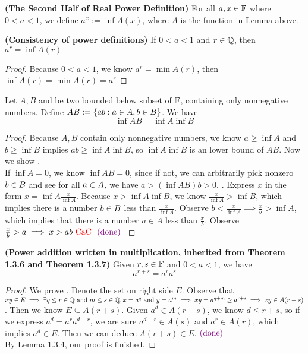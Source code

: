 \documentclass{report}
\begin{document}
\begin{definition}
\textbf{(The Second Half of Real Power Definition)} For all $a,x\in\mathbb{F}$ where $0<a<1$, we define  $a^x:=\inf  A(x)$, where $A$ is the function in Lemma above.
\end{definition}
\begin{theorem}
\textbf{(Consistency of power definitions)} If $0<a<1$ and  $r\in\mathbb{Q}$, then $a^r=\inf A(r)$
\end{theorem}
\begin{proof}
Because $0<a<1$, we know  $a^r=\min A(r)$, then $\inf A(r)=\min A(r)=a^r$   
\end{proof}
\begin{lemma}
Let $A,B$ and be two bounded below subset of  $\mathbb{F}$, containing only nonnegative numbers. Define $AB:=\{ ab:a\in A,b\in B \}$. We have    
\begin{equation}
\inf  AB=\inf  A \inf  B
\end{equation}
\end{lemma}
\begin{proof}
Because $A,B$ contain only nonnegative numbers, we know $a\geq \inf  A$ and $b\geq \inf  B$ implies $ab\geq \inf  A \inf  B$, so $\inf  A \inf  B$ is an lower bound of $AB$. Now we show .\\

If $\inf A=0$, we know $\inf AB=0$, since if not, we can arbitrarily pick nonzero $b\in B$ and see for all $a\in A$, we have $a>(\inf AB)b>0$. . Express $x$ in the form  $x=\inf  A \frac{x}{\inf  A}$. Because $x>\inf  A \inf  B$, we know $\frac{x}{\inf  A}>\inf  B$, which implies there is a number  $b\in B$ less than $\frac{x}{\inf  A}$. Observe $b<\frac{x}{\inf  A}\implies \frac{x}{b}>\inf  A$, which implies that there is a number $a\in A$ less than  $\frac{x}{b}$. Observe  $\frac{x}{b}>a\implies x>ab \text{ \textcolor{red}{CaC} }\textcolor{violet}{\text{ (done) }}$  
\end{proof}
\begin{theorem}
\textbf{(Power addition written in multiplication, inherited from Theorem 1.3.6 and Theorem 1.3.7)} Given $r,s\in\mathbb{F}$ and $0<a<1$, we have
\begin{equation}
  a^{r+s}=a^ra^s
\end{equation}
\end{theorem}
\begin{proof}
We prove . Denote the set on right side $E$. Observe that $xy\in E \implies \exists q\leq r\in\mathbb{Q}\text{ and }m\leq s\in\mathbb{Q}, x=a^q\text{ and }y=a^m\implies xy=a^{q+m}\geq a^{r+s}\implies xy\in A(r+s)$. Then we know $E\subseteq A(r+s)$. Given $a^d\in A(r+s)$, we know $d\leq r+s$, so if we express $a^d=a^ra^{d-r}$, we are sure $a^{d-r}\in A(s)$ and $a^r\in A(r)$, which implies $a^d\in E$. Then we can deduce $A(r+s)\in E$.$\textcolor{violet}{\text{ (done) }}$\\

By Lemma 1.3.4, our proof is finished.
\end{proof}
\end{document}
